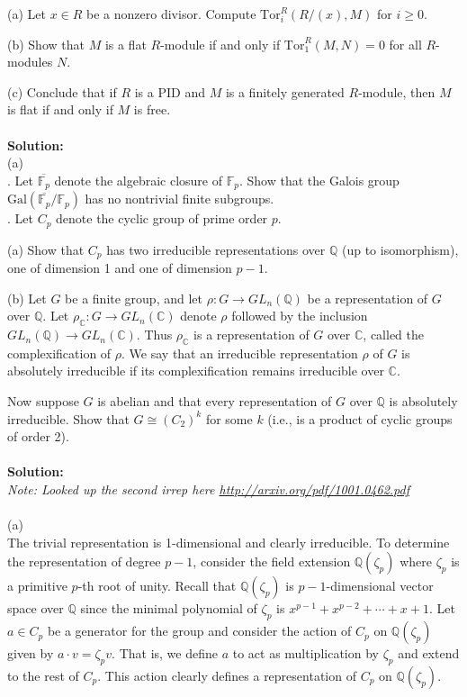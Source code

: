 \documentclass[11pt]{article}
\newcommand{\Q}{\mathbb{Q}}
\newcommand{\F}{\mathbb{F}}
\newcommand{\C}{\mathbb{C}}
\begin{document}
(a) Let $x \in R$ be a nonzero divisor. Compute $\mbox{Tor}_i^R(R/(x), M)$  for $i \ge 0$.

(b) Show that $M$ is a flat $R$-module if and only if $\mbox{Tor}^R_1(M,N) = 0$ for all $R$-modules $N$.

(c) Conclude that if $R$ is a PID and $M$ is a finitely generated $R$-module, then $M$ is
flat if and only if $M$ is free.\\\\
\textbf{Solution:}\\
(a)\\

. Let $\overline{\F_p}$ denote the algebraic closure of $\F_p$. Show that the Galois group $\mbox{Gal}(\overline{\F_p}/\F_p)$ has
no nontrivial finite subgroups.\\
. Let $C_p$ denote the cyclic group of prime order $p$.

(a) Show that $C_p$ has two irreducible representations over $\Q$ (up to isomorphism),
one of dimension 1 and one of dimension $p- 1$.

(b) Let $G$ be a finite group, and let $\rho : G\to GL_n(\Q)$ be a representation of $G$
over $\Q$. Let $\rho_\C : G \to GL_n(\C)$ denote $\rho$ followed by the inclusion $GL_n(\Q) \to 
GL_n(\C)$. Thus $\rho_\C$ is a representation of $G$ over $\C$, called the complexification of
$\rho$. We say that an irreducible representation $\rho$ of $G$ is absolutely irreducible if its
complexification remains irreducible over $\C.$

Now suppose $G$ is abelian and that every representation of $G$ over $\Q$ is absolutely
irreducible. Show that $G \cong  (C_2)^k$
for some $k$ (i.e., is a product of cyclic groups
of order 2).\\\\
\textbf{Solution:}\\
\emph{Note: Looked up the second irrep here \url{http://arxiv.org/pdf/1001.0462.pdf}}\\\\
(a)\\
The trivial representation is 1-dimensional and clearly irreducible. To determine the representation of degree $p-1$, consider the field extension $\Q(\zeta_p)$ where $\zeta_p$ is a primitive $p$-th root of unity. Recall that $\Q(\zeta_p)$ is $p-1$-dimensional vector space over $\Q$ since the minimal polynomial of $\zeta_p$ is $x^{p-1}+x^{p-2}+\cdots + x + 1$. Let $a\in C_p$ be a generator for the group and consider the action of $C_p$ on $\Q(\zeta_p)$ given by  $a\cdot v = \zeta_p v$. That is, we define $a$ to act as multiplication by $\zeta_p$ and extend to the rest of $C_p$. This action clearly defines a representation of $C_p$ on $\Q(\zeta_p)$.
\end{document}
